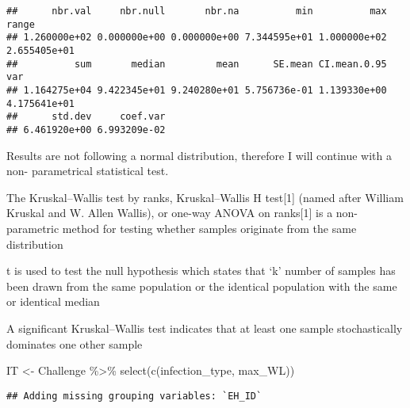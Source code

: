 \documentclass[
]{article}
\newenvironment{Shaded}{\begin{snugshade}}{\end{snugshade}}
\newcommand{\FunctionTok}[1]{\textcolor[rgb]{0.00,0.00,0.00}{#1}}
\newcommand{\NormalTok}[1]{#1}
\newcommand{\OtherTok}[1]{\textcolor[rgb]{0.56,0.35,0.01}{#1}}
\newcommand{\SpecialCharTok}[1]{\textcolor[rgb]{0.00,0.00,0.00}{#1}}
\begin{document}
\begin{verbatim}
##      nbr.val     nbr.null       nbr.na          min          max        range 
## 1.260000e+02 0.000000e+00 0.000000e+00 7.344595e+01 1.000000e+02 2.655405e+01 
##          sum       median         mean      SE.mean CI.mean.0.95          var 
## 1.164275e+04 9.422345e+01 9.240280e+01 5.756736e-01 1.139330e+00 4.175641e+01 
##      std.dev     coef.var 
## 6.461920e+00 6.993209e-02
\end{verbatim}

Results are not following a normal distribution, therefore I will
continue with a non- parametrical statistical test.

The Kruskal--Wallis test by ranks, Kruskal--Wallis H test{[}1{]} (named
after William Kruskal and W. Allen Wallis), or one-way ANOVA on
ranks{[}1{]} is a non-parametric method for testing whether samples
originate from the same distribution

t is used to test the null hypothesis which states that `k' number of
samples has been drawn from the same population or the identical
population with the same or identical median

A significant Kruskal--Wallis test indicates that at least one sample
stochastically dominates one other sample

\begin{Shaded}
\begin{Highlighting}[]
\NormalTok{IT }\OtherTok{\textless{}{-}}\NormalTok{ Challenge }\SpecialCharTok{\%\textgreater{}\%} 
  \FunctionTok{select}\NormalTok{(}\FunctionTok{c}\NormalTok{(infection\_type, max\_WL)) }
\end{Highlighting}
\end{Shaded}

\begin{verbatim}
## Adding missing grouping variables: `EH_ID`
\end{verbatim}
\end{document}

